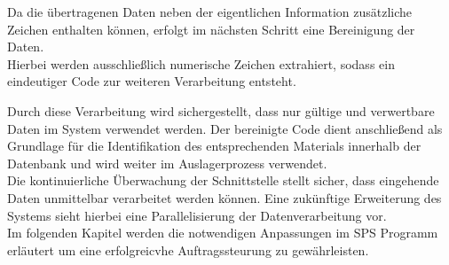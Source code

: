 Da die übertragenen Daten neben der eigentlichen Information zusätzliche Zeichen enthalten können, erfolgt im nächsten Schritt eine Bereinigung der Daten.\\
Hierbei werden ausschließlich numerische Zeichen extrahiert, sodass ein eindeutiger Code zur weiteren Verarbeitung entsteht.

Durch diese Verarbeitung wird sichergestellt, dass nur gültige und verwertbare Daten im System verwendet werden. Der bereinigte Code dient anschließend als Grundlage für die Identifikation des entsprechenden Materials innerhalb der Datenbank und wird weiter im Auslagerprozess verwendet.\\

Die kontinuierliche Überwachung der Schnittstelle stellt sicher, dass eingehende Daten unmittelbar verarbeitet werden können. Eine zukünftige Erweiterung des Systems sieht hierbei eine Parallelisierung der Datenverarbeitung vor.\\

Im folgenden Kapitel werden die notwendigen Anpassungen im SPS Programm erläutert um eine erfolgreicvhe Auftragssteurung zu gewährleisten.